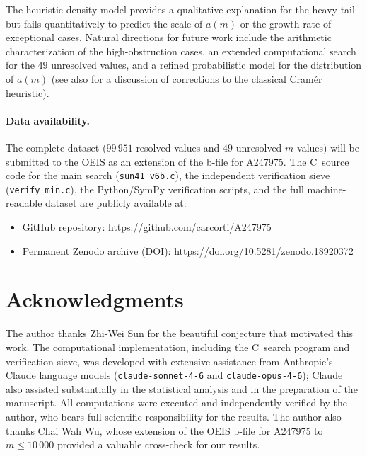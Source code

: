 \documentclass[12pt]{article}
\begin{document}
The heuristic density model provides a qualitative explanation for the
heavy tail but fails quantitatively to predict the scale of $a(m)$ or
the growth rate of exceptional cases.
Natural directions for future work include the arithmetic
characterization of the high-obstruction cases, an extended
computational search for the $49$ unresolved values, and a refined
probabilistic model for the distribution of $a(m)$
(see also \cite{Granville1995} for a discussion of corrections to
the classical Cram\'er heuristic).

\paragraph{Data availability.}
The complete dataset ($99\,951$ resolved values and $49$ unresolved
$m$-values) will be submitted to the OEIS as an extension of the
b-file for A247975.
The C~source code for the main search (\texttt{sun41\_v6b.c}), the
independent verification sieve (\texttt{verify\_min.c}), the
Python/SymPy verification scripts, and the full machine-readable
dataset are publicly available at:
\begin{itemize}
  \item GitHub repository: \url{https://github.com/carcorti/A247975}
  \item Permanent Zenodo archive (DOI):
        \url{https://doi.org/10.5281/zenodo.18920372}
\end{itemize}

\section*{Acknowledgments}

The author thanks Zhi-Wei Sun for the beautiful conjecture that
motivated this work.
The computational implementation, including the C~search program and
verification sieve, was developed with extensive assistance from
Anthropic's Claude language models (\texttt{claude-sonnet-4-6} and
\texttt{claude-opus-4-6}); Claude also assisted substantially in the
statistical analysis and in the preparation of the manuscript.
All computations were executed and independently verified by the author,
who bears full scientific responsibility for the results.
The author also thanks Chai Wah Wu, whose extension of the OEIS b-file
for A247975 to $m \leq 10\,000$ provided a valuable cross-check for
our results.
\end{document}

